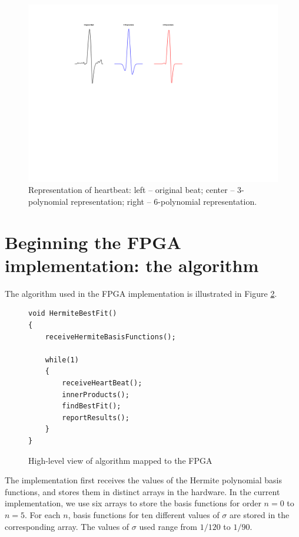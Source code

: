 \documentclass[conference]{IEEEtran}
\begin{document}
\begin{figure}[t]
	\centering
\includegraphics[width=\linewidth]{qrs_hermite.pdf} 
	\caption{Representation of heartbeat: left -- original beat; center -- 3-polynomial representation; right -- 6-polynomial representation.}
\label{fig:qrs}
	\end{figure}
	

\section{Beginning the FPGA implementation: the algorithm} \label{s:algorithm}

The algorithm used in the FPGA implementation is illustrated in 
Figure \ref{fig:FpgaAlgo}.
\begin{figure}
\begin{centering}
\small\begin{verbatim}
void HermiteBestFit()
{  
    receiveHermiteBasisFunctions();

    while(1)
    {
        receiveHeartBeat();
        innerProducts();
        findBestFit();
        reportResults();
    }
}
\end{verbatim}
\normalsize
\end{centering}
\caption{High-level view of algorithm mapped to the FPGA}
\label{fig:FpgaAlgo}
\end{figure}

The implementation first receives the values of the Hermite polynomial basis
functions, and  stores them in distinct arrays in the hardware.  In the
current implementation, we use six
arrays to store the basis functions for order $n=0$ to $n=5$.  For each
$n$, basis functions for ten different values of $\sigma$ are stored in the corresponding
array.  The values of $\sigma$ used range from $1/120$ to $1/90$.
\end{document}

